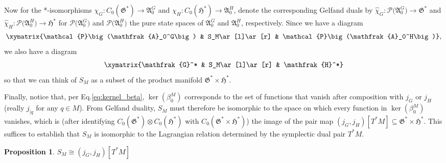 \documentclass[sn-mathphys,Numbered]{sn-jnl}
\newtheorem{proposition}[theorem]{Proposition}%
\begin{document}
Now for the *-isomorphisms $\chi_G:C_0(\mathfrak{G}^*)\to \mathfrak{A}_0^G$ and $\chi_H: C_0(\mathfrak{H}^*)\to\mathfrak{A}^H_0$, denote the corresponding Gelfand duals by $\hat{\chi}_G: \mathcal{P}\big(\mathfrak{A}_0^G\big)\to \mathfrak{G}^*$ and $\hat{\chi}_H: \mathcal{P}\big(\mathfrak{A}_0^H\big)\to\mathfrak{H}^*$ for $\mathcal{P}\big(\mathfrak{A}_0^G\big)$ and $\mathcal{P}\big(\mathfrak{A}_0^H\big)$ the pure state spaces of $\mathfrak{A}_0^G$ and $\mathfrak{A}_0^H$, respectively. 
Since we have a diagram
\begin{align}
   \xymatrix{\mathcal{P}\big(\mathfrak{A}_0^G\big) & S_M\ar[l]\ar[r] & \mathcal{P}\big(\mathfrak{A}_0^H\big)},
\end{align}
we also have a diagram
\begin{align}
   \xymatrix{\mathfrak{G}^* & S_M\ar[l]\ar[r] & \mathfrak{H}^*}
\end{align}
so that we can think of $S_M$ as a subset of the product manifold $\mathfrak{G}^*\times\mathfrak{H}^*$.

Finally, notice that, per Eq.\eqref{eq:kernel_beta}, $\ker(\beta_0^M)$ corresponds to the set of functions that vanish after composition with $j_G$ or $j_H$ (really $j_{|q}$ for any $q\in M$).  From Gelfand duality, $S_M$ must therefore be isomorphic to the space on which every function in $\ker(\beta_0^M)$ vanishes, which is (after identifying $C_0(\mathfrak{G}^*)\otimes C_0(\mathfrak{H}^*)$ with $C_0(\mathfrak{G}^*\times\mathfrak{H}^*)$) the image of the pair map $(j_G,j_H)[T^*M]\subseteq \mathfrak{G}^*\times\mathfrak{H}^*$.  This suffices to establish that $S_M$ is isomorphic to the Lagrangian relation determined by the symplectic dual pair $T^*M$.\bigskip

\begin{proposition}
    $S_M\cong (j_G,j_H)[T^*M]$
\end{proposition}\bigskip
\end{document}
